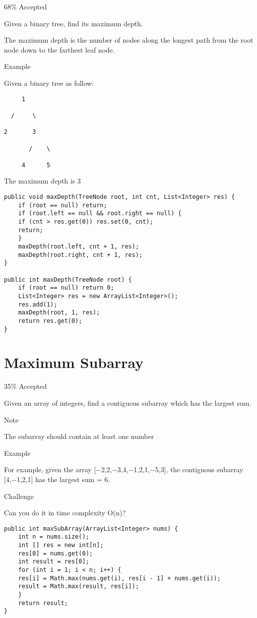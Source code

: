 \documentclass[12pt]{book}
\begin{document}
68\% Accepted

Given a binary tree, find its maximum depth.

The maximum depth is the number of nodes along the longest path from the root node down to the farthest leaf node.

Example

Given a binary tree as follow:
\lstset{language=java,label= ,caption= ,numbers=none}
\begin{lstlisting}
     1

  /     \ 

2       3

       /    \

     4      5
\end{lstlisting}

The maximum depth is 3
\lstset{language=java,label= ,caption= ,numbers=none}
\begin{lstlisting}
public void maxDepth(TreeNode root, int cnt, List<Integer> res) {
    if (root == null) return;
    if (root.left == null && root.right == null) {
	if (cnt > res.get(0)) res.set(0, cnt);
	return;
    }
    maxDepth(root.left, cnt + 1, res);
    maxDepth(root.right, cnt + 1, res);
}

public int maxDepth(TreeNode root) {
    if (root == null) return 0;
    List<Integer> res = new ArrayList<Integer>();
    res.add(1);
    maxDepth(root, 1, res);
    return res.get(0);
}
\end{lstlisting}
\chapter{Maximum Subarray}
\label{sec-37}

35\% Accepted

Given an array of integers, find a contiguous subarray which has the largest sum.

Note

The subarray should contain at least one number

Example

For example, given the array [−2,2,−3,4,−1,2,1,−5,3], the contiguous subarray [4,−1,2,1] has the largest sum = 6.

Challenge

Can you do it in time complexity O(n)?
\lstset{language=java,label= ,caption= ,numbers=none}
\begin{lstlisting}
public int maxSubArray(ArrayList<Integer> nums) {
    int n = nums.size();
    int [] res = new int[n];
    res[0] = nums.get(0);
    int result = res[0];
    for (int i = 1; i < n; i++) {
	res[i] = Math.max(nums.get(i), res[i - 1] + nums.get(i));
	result = Math.max(result, res[i]);
    }
    return result;
}
\end{lstlisting}
\end{document}
